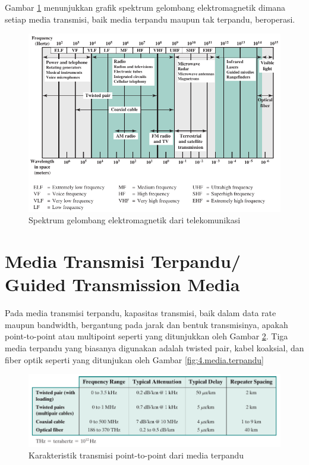 Gambar \ref{fig:4.1.spectrum_em_telecom} menunjukkan grafik spektrum gelombang elektromagnetik dimana setiap media transmisi, baik media terpandu maupun tak terpandu, beroperasi.

\begin{figure}
	\centering
	\includegraphics[width=1\linewidth]{gambar/4.1.gambar.4.1.spectrum_emw_media_transmisi}
	\caption{Spektrum gelombang elektromagnetik dari telekomunikasi}
	\label{fig:4.1.spectrum_em_telecom}
\end{figure}

\section{Media Transmisi Terpandu/ Guided Transmission Media}

Pada media transmisi terpandu, kapasitas transmisi, baik dalam data rate maupun bandwidth, bergantung pada jarak dan bentuk transmisinya, apakah point-to-point atau multipoint seperti yang ditunjukkan oleh Gambar \ref{fig:4.table_point_to_point}. Tiga media terpandu yang biasanya digunakan adalah twisted pair, kabel koaksial, dan fiber optik seperti yang ditunjukan oleh Gambar \ref{fig:4.media.terpandu}

\begin{figure}
	\centering
	\includegraphics[width=1\linewidth]{gambar/4.1.table_4.1.point_to_point_characteristics}
	\caption{Karakteristik transmisi point-to-point dari media terpandu}
	\label{fig:4.table_point_to_point}
\end{figure}


